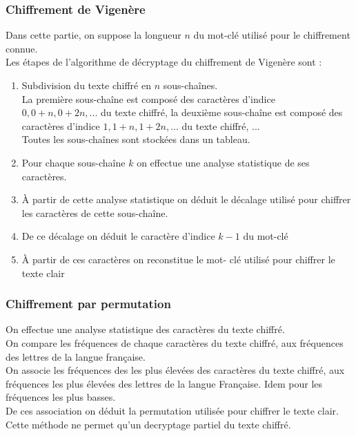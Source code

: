 \documentclass{article}
\begin{document}
\vspace{2\baselineskip}

\subsubsection{Chiffrement de Vigenère}
\vspace{1\baselineskip}

Dans cette partie, on suppose la longueur $n$ du mot-clé utilisé pour le chiffrement connue. \\
Les étapes de l'algorithme de décryptage du chiffrement de Vigenère sont : \\
\begin{enumerate}
\item Subdivision du texte chiffré en $n$ sous-chaînes. \\
La première sous-chaîne est composé des caractères d'indice $0, 0+n, 0+2n, ...$ du texte chiffré, la deuxième sous-chaîne est composé des caractères d'indice $1, 1+n, 1+2n, ...$ du texte chiffré, ... \\
Toutes les sous-chaînes sont stockées dans un tableau. \\
\item Pour chaque sous-chaîne $k$ on effectue une analyse statistique de ses caractères.
\item À partir de cette analyse statistique on déduit le décalage utilisé pour chiffrer les caractères de cette sous-chaîne.
\item De ce décalage on déduit le caractère d'indice $k-1$ du mot-clé
\item À partir de ces caractères on reconstitue le mot- clé utilisé pour chiffrer le texte clair
\end{enumerate}
\vspace{2\baselineskip}

\subsubsection{Chiffrement par permutation}
\vspace{1\baselineskip}

On effectue une analyse statistique des caractères du texte chiffré. \\
On compare les fréquences de chaque caractères du texte chiffré, aux fréquences des lettres de la langue française. \\
On associe les fréquences des les plus élevées des caractères du texte chiffré, aux fréquences les plus élevées des lettres de la langue Française. Idem pour les fréquences les plus basses. \\
De ces association on déduit la permutation utilisée pour chiffrer le texte clair. \\
Cette méthode ne permet qu'un decryptage partiel du texte chiffré. \\
\vspace{2\baselineskip}
\end{document}
